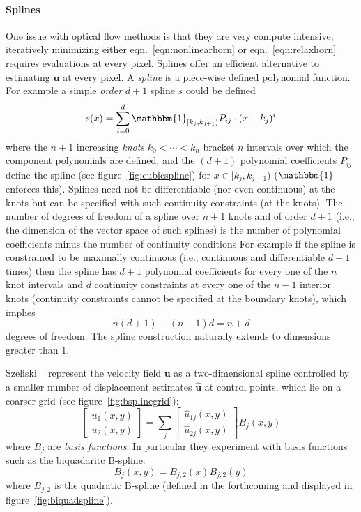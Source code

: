 \paragraph{Splines}

One issue with optical flow methods is that they are very compute intensive; iteratively minimizing either eqn.~\eqref{eqn:nonlinearhorn} or eqn.~\eqref{eqn:relaxhorn} requires evaluations at every pixel.
%
Splines offer an efficient alternative to estimating \(\mathbf{u}\) at every pixel.
%
A \textit{spline} is a piece-wise defined polynomial function. For example a simple \textit{order} \(d+1\) spline \(s\) could be defined
\[
		s(x) = \sum_{i=0}^d \mathbbm{1}_{[k_j, k_{j+1})}P_{ij} \cdot (x - k_j)^i
\]
where the \(n+1\) increasing \textit{knots} \(k_0 < \cdots < k_n\) bracket \(n\) intervals over which the component polynomials are defined, and the \((d+1)\) polynomial coefficients \(P_{ij}\) define the spline (see figure~\ref{fig:cubicspline}) for \(x \in [k_j, k_{j+1})\) (\(\mathbbm{1}\) enforces this).
%
Splines need not be differentiable (nor even continuous) at the knots but can be specified with such continuity constraints (at the knots).
%
The number of degrees of freedom of a spline over \(n+1\) knots and of order \(d+1\) (i.e., the dimension of the vector space of such splines) is the number of polynomial coefficients minus the number of continuity conditions
%
For example if the spline is constrained to be maximally continuous (i.e., continuous and differentiable \(d-1\) times) then the spline has \(d+1\) polynomial coefficients for every one of the \(n\) knot intervals and \(d\) continuity constraints at every one of the \(n-1\) interior knots (continuity constraints cannot be specified at the boundary knots), which implies 
\[
	n(d+1) - (n-1)d = n+d
\]
degrees of freedom. The spline construction naturally extends to dimensions greater than 1.

Szeliski \etal~\cite{szeliski1997spline} represent the velocity field \(\mathbf{u}\) as a two-dimensional spline controlled by a smaller number of displacement estimates \(\hat{\mathbf{u}}\) at control points, which lie on a coarser grid (see figure~\ref{fig:bsplinegrid}):
%
\begin{equation}
	\begin{bmatrix}
		u_1(x,y) \\ u_2(x,y)
	\end{bmatrix} = \sum_j \begin{bmatrix}
		\hat{u}_{1j}(x,y) \\ \hat{u}_{2j}(x,y)
	\end{bmatrix} B_j(x, y)
\end{equation}
where \(B_j\) are \textit{basis functions}. 
%
In particular they experiment with basis functions such as the biquadaritc B-spline:
\[
	B_j(x,y) = B_{j,2}(x) B_{j,2}(y)
\]
where \(B_{j,2}\) is the quadratic B-spline (defined in the forthcoming and displayed in figure~\ref{fig:biquadspline}).

